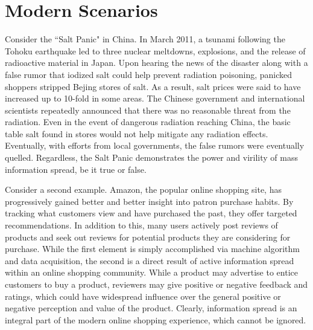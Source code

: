 \section{Modern Scenarios}
Consider the ``Salt Panic" in China. In March 2011, a tsunami following the Tohoku earthquake led to three nuclear meltdowns, explosions, and the release of radioactive material in Japan. Upon hearing the news of the disaster along with a false rumor that iodized salt could help prevent radiation poisoning, panicked shoppers stripped Bejing stores of salt. As a result, salt prices were said to have increased up to 10-fold in some areas. The Chinese government and international scientists repeatedly announced that there was no reasonable threat from the radiation. Even in the event of dangerous radiation reaching China, the basic table salt found in stores would not help mitigate any radiation effects. Eventually, with efforts from local governments, the false rumors were eventually quelled. Regardless, the Salt Panic demonstrates the power and virility of mass information spread, be it true or false. 

Consider a second example. Amazon, the popular online shopping site, has progressively gained better and better insight into patron purchase habits. By tracking what customers view and have purchased the past, they offer targeted recommendations. In addition to this, many users actively post reviews of products and seek out reviews for potential products they are considering for purchase. While the first element is simply accomplished via machine algorithm and data acquisition, the second is a direct result of active information spread within an online shopping community. While a product may advertise to entice customers to buy a product, reviewers may give positive or negative feedback and ratings, which could have widespread influence over the general positive or negative perception and value of the product. Clearly, information spread is an integral part of the modern online shopping experience, which cannot be ignored.

